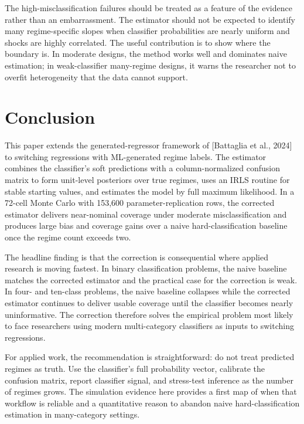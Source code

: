 \documentclass[
  12pt,
  letterpaper]{article}
\begin{document}
The high-misclassification failures should be treated as a feature of
the evidence rather than an embarrassment. The estimator should not be
expected to identify many regime-specific slopes when classifier
probabilities are nearly uniform and shocks are highly correlated. The
useful contribution is to show where the boundary is. In moderate
designs, the method works well and dominates naive estimation; in
weak-classifier many-regime designs, it warns the researcher not to
overfit heterogeneity that the data cannot support.

\FloatBarrier

\section{Conclusion}\label{conclusion}

This paper extends the generated-regressor framework of {[}Battaglia et
al., 2024{]} to switching regressions with ML-generated regime labels.
The estimator combines the classifier's soft predictions with a
column-normalized confusion matrix to form unit-level posteriors over
true regimes, uses an IRLS routine for stable starting values, and
estimates the model by full maximum likelihood. In a 72-cell Monte Carlo
with 153,600 parameter-replication rows, the corrected estimator
delivers near-nominal coverage under moderate misclassification and
produces large bias and coverage gains over a naive hard-classification
baseline once the regime count exceeds two.

The headline finding is that the correction is consequential where
applied research is moving fastest. In binary classification problems,
the naive baseline matches the corrected estimator and the practical
case for the correction is weak. In four- and ten-class problems, the
naive baseline collapses while the corrected estimator continues to
deliver usable coverage until the classifier becomes nearly
uninformative. The correction therefore solves the empirical problem
most likely to face researchers using modern multi-category classifiers
as inputs to switching regressions.

For applied work, the recommendation is straightforward: do not treat
predicted regimes as truth. Use the classifier's full probability
vector, calibrate the confusion matrix, report classifier signal, and
stress-test inference as the number of regimes grows. The simulation
evidence here provides a first map of when that workflow is reliable and
a quantitative reason to abandon naive hard-classification estimation in
many-category settings.
\end{document}
